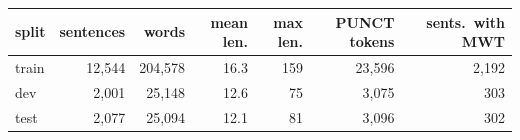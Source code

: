 \begin{tabular}{lrrrrrr}
\toprule
split & sentences & words & mean len. & max len. & PUNCT tokens & sents.\ with MWT \\
\midrule
train & 12,544 & 204,578 & 16.3 & 159 & 23,596 & 2,192 \\
dev & 2,001 & 25,148 & 12.6 & 75 & 3,075 & 303 \\
test & 2,077 & 25,094 & 12.1 & 81 & 3,096 & 302 \\
\bottomrule
\end{tabular}
